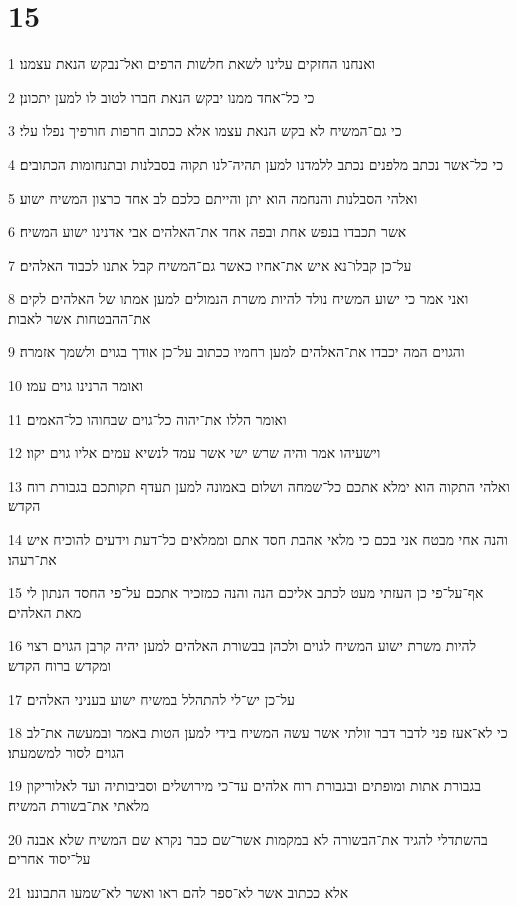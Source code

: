 \chapter{15}

\par 1 ואנחנו החזקים עלינו לשאת חלשות הרפים ואל־נבקש הנאת עצמנו׃
\par 2 כי כל־אחד ממנו יבקש הנאת חברו לטוב לו למען יתכונן׃
\par 3 כי גם־המשיח לא בקש הנאת עצמו אלא ככתוב חרפות חורפיך נפלו עלי׃
\par 4 כי כל־אשר נכתב מלפנים נכתב ללמדנו למען תהיה־לנו תקוה בסבלנות ובתנחומות הכתובים׃
\par 5 ואלהי הסבלנות והנחמה הוא יתן והייתם כלכם לב אחד כרצון המשיח ישוע׃
\par 6 אשר תכבדו בנפש אחת ובפה אחד את־האלהים אבי אדנינו ישוע המשיח׃
\par 7 על־כן קבלו־נא איש את־אחיו כאשר גם־המשיח קבל אתנו לכבוד האלהים׃
\par 8 ואני אמר כי ישוע המשיח נולד להיות משרת הנמולים למען אמתו של האלהים לקים את־ההבטחות אשר לאבות׃
\par 9 והגוים המה יכבדו את־האלהים למען רחמיו ככתוב על־כן אודך בגוים ולשמך אזמרה׃
\par 10 ואומר הרנינו גוים עמו׃
\par 11 ואומר הללו את־יהוה כל־גוים שבחוהו כל־האמים׃
\par 12 וישעיהו אמר והיה שרש ישי אשר עמד לנשיא עמים אליו גוים יקוו׃
\par 13 ואלהי התקוה הוא ימלא אתכם כל־שמחה ושלום באמונה למען תעדף תקותכם בגבורת רוח הקדש׃
\par 14 והנה אחי מבטח אני בכם כי מלאי אהבת חסד אתם וממלאים כל־דעת וידעים להוכיח איש את־רעהו׃
\par 15 אף־על־פי כן העזתי מעט לכתב אליכם הנה והנה כמזכיר אתכם על־פי החסד הנתון לי מאת האלהים׃
\par 16 להיות משרת ישוע המשיח לגוים ולכהן בבשורת האלהים למען יהיה קרבן הגוים רצוי ומקדש ברוח הקדש׃
\par 17 על־כן יש־לי להתהלל במשיח ישוע בעניני האלהים׃
\par 18 כי לא־אעז פני לדבר דבר זולתי אשר עשה המשיח בידי למען הטות באמר ובמעשה את־לב הגוים לסור למשמעתו׃
\par 19 בגבורת אתות ומופתים ובגבורת רוח אלהים עד־כי מירושלים וסביבותיה ועד לאלוריקון מלאתי את־בשורת המשיח׃
\par 20 בהשתדלי להגיד את־הבשורה לא במקמות אשר־שם כבר נקרא שם המשיח שלא אבנה על־יסוד אחרים׃
\par 21 אלא ככתוב אשר לא־ספר להם ראו ואשר לא־שמעו התבוננו׃
